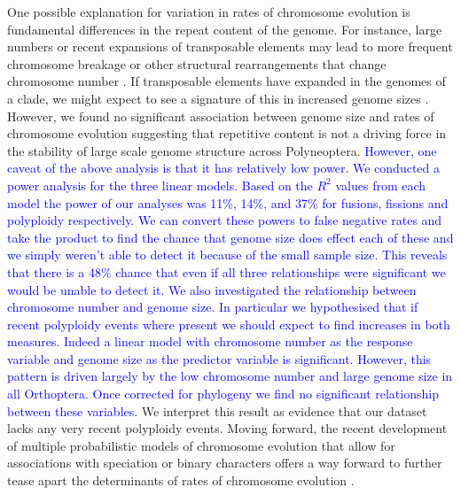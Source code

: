 \documentclass[]{rsos}%
\begin{document}
One possible explanation for variation in rates of chromosome evolution is fundamental differences in the repeat content of the genome.
For instance, large numbers or recent expansions of transposable elements may lead to more frequent chromosome breakage or other structural rearrangements that change chromosome number \cite{carbone2014gibbon}.
If transposable elements have expanded in the genomes of a clade, we might expect to see a signature of this in increased genome sizes \cite{kidwell2002transposable}.
However, we found no significant association between genome size and rates of chromosome evolution suggesting that repetitive content is not a driving force in the stability of large scale genome structure across Polyneoptera.
\textcolor{blue}{However, one caveat of the above analysis is that it has relatively low power. 
We conducted a power analysis for the three linear models.
Based on the $R^2$ values from each model the power of our analyses was 11\%, 14\%, and 37\% for fusions, fissions and polyploidy respectively.
We can convert these powers to false negative rates and take the product to find the chance that genome size does effect each of these and we simply weren't able to detect it because of the small sample size.
This reveals that there is a 48\% chance that even if all three relationships were significant we would be unable to detect it.
We also investigated the relationship between chromosome number and genome size.
In particular we hypothesised that if recent polyploidy events where present we should expect to find increases in both measures.
Indeed a linear model with chromosome number as the response variable and genome size as the predictor variable is significant.
However, this pattern is driven largely by the low chromosome number and large genome size in all Orthoptera.
Once corrected for phylogeny we find no significant relationship between these variables.}
We interpret this result as evidence that our dataset lacks any very recent polyploidy events.
Moving forward, the recent development of multiple probabilistic models of chromosome evolution that allow for associations with speciation or binary characters offers a way forward to further tease apart the determinants of rates of chromosome evolution \cite{freyman2018, zenil2018chromploid, blackmon2019meiotic}.

\end{document}
